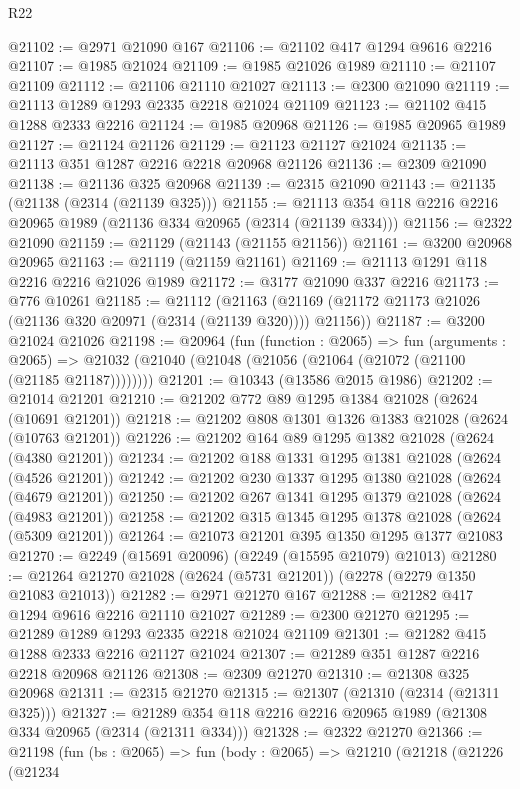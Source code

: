 \begin{lexlean}{R22}
\begin{coremodule}
@21102 := @2971 @21090 @167
@21106 := @21102 @417 @1294 @9616 @2216
@21107 := @1985 @21024
@21109 := @1985 @21026 @1989
@21110 := @21107 @21109
@21112 := @21106 @21110 @21027
@21113 := @2300 @21090
@21119 := @21113 @1289 @1293 @2335 @2218 @21024 @21109
@21123 := @21102 @415 @1288 @2333 @2216
@21124 := @1985 @20968
@21126 := @1985 @20965 @1989
@21127 := @21124 @21126
@21129 := @21123 @21127 @21024
@21135 := @21113 @351 @1287 @2216 @2218 @20968 @21126
@21136 := @2309 @21090
@21138 := @21136 @325 @20968
@21139 := @2315 @21090
@21143 := @21135 (@21138 (@2314 (@21139 @325)))
@21155 := @21113 @354 @118 @2216 @2216 @20965 @1989 (@21136 @334 @20965 (@2314 (@21139 @334)))
@21156 := @2322 @21090
@21159 := @21129 (@21143 (@21155 @21156))
@21161 := @3200 @20968 @20965
@21163 := @21119 (@21159 @21161)
@21169 := @21113 @1291 @118 @2216 @2216 @21026 @1989
@21172 := @3177 @21090 @337 @2216
@21173 := @776 @10261
@21185 := @21112
    (@21163 (@21169 (@21172 @21173 @21026 (@21136 @320 @20971 (@2314 (@21139 @320)))) @21156))
@21187 := @3200 @21024 @21026
@21198 := @20964
    (fun (function : @2065) =>
    fun (arguments : @2065) =>
    @21032 (@21040 (@21048 (@21056 (@21064 (@21072 (@21100 (@21185 @21187))))))))
@21201 := @10343 (@13586 @2015 @1986)
@21202 := @21014 @21201
@21210 := @21202 @772 @89 @1295 @1384 @21028 (@2624 (@10691 @21201))
@21218 := @21202 @808 @1301 @1326 @1383 @21028 (@2624 (@10763 @21201))
@21226 := @21202 @164 @89 @1295 @1382 @21028 (@2624 (@4380 @21201))
@21234 := @21202 @188 @1331 @1295 @1381 @21028 (@2624 (@4526 @21201))
@21242 := @21202 @230 @1337 @1295 @1380 @21028 (@2624 (@4679 @21201))
@21250 := @21202 @267 @1341 @1295 @1379 @21028 (@2624 (@4983 @21201))
@21258 := @21202 @315 @1345 @1295 @1378 @21028 (@2624 (@5309 @21201))
@21264 := @21073 @21201 @395 @1350 @1295 @1377 @21083
@21270 := @2249 (@15691 @20096) (@2249 (@15595 @21079) @21013)
@21280 := @21264 @21270 @21028 (@2624 (@5731 @21201)) (@2278 (@2279 @1350 @21083 @21013))
@21282 := @2971 @21270 @167
@21288 := @21282 @417 @1294 @9616 @2216 @21110 @21027
@21289 := @2300 @21270
@21295 := @21289 @1289 @1293 @2335 @2218 @21024 @21109
@21301 := @21282 @415 @1288 @2333 @2216 @21127 @21024
@21307 := @21289 @351 @1287 @2216 @2218 @20968 @21126
@21308 := @2309 @21270
@21310 := @21308 @325 @20968
@21311 := @2315 @21270
@21315 := @21307 (@21310 (@2314 (@21311 @325)))
@21327 := @21289 @354 @118 @2216 @2216 @20965 @1989 (@21308 @334 @20965 (@2314 (@21311 @334)))
@21328 := @2322 @21270
@21366 := @21198
    (fun (bs : @2065) =>
    fun (body : @2065) =>
    @21210
      (@21218
        (@21226
          (@21234

\end{coremodule}
\end{lexlean}
